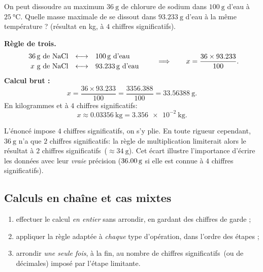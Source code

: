 \documentclass[11pt,a4paper]{article}
\newcommand{\CS}{chiffres significatifs}
\begin{document}
\begin{exemple}
On peut dissoudre au maximum $\qty{36}{\gram}$ de chlorure de sodium  dans $\qty{100}{\gram}$
d'eau à $\qty{25}{\celsius}$. Quelle masse maximale de  se dissout dans $\qty{93,233}{\gram}$
d'eau à la même température ? (résultat en \si{\kilo\gram}, à $4$ \CS).

\textbf{Règle de trois.}
\[
\begin{array}{r c l}
 \qty{36}{\gram}\ \text{de \ce{NaCl}} &\longleftrightarrow& \qty{100}{\gram}\ \text{d'eau}\\[2pt]
 x\ \text{g de \ce{NaCl}}             &\longleftrightarrow& \qty{93,233}{\gram}\ \text{d'eau}
\end{array}
\qquad\Longrightarrow\qquad
x=\frac{\num{36}\times\num{93,233}}{\num{100}}.
\]
\textbf{Calcul brut :}
\[ x=\frac{\num{36}\times\num{93,233}}{\num{100}}=\frac{\num{3356,388}}{\num{100}}=\qty{33,56388}{\gram}. \]
En kilogrammes et à $4$ \CS :
\[ \boxed{x\approx\qty{0,03356}{\kilo\gram}=\num{3,356e-2}\ \si{\kilo\gram}}. \]
\begin{remarque}
L'énoncé impose $4$ \CS, on s'y plie. En toute rigueur cependant, $\qty{36}{\gram}$ n'a que $2$ \CS :
la règle de multiplication limiterait alors le résultat à $2$ \CS\ ($\approx\qty{34}{\gram}$). Cet
écart illustre l'importance d'écrire les données avec leur \emph{vraie} précision
($\qty{36{,}00}{\gram}$ si elle est connue à $4$ \CS).
\end{remarque}
\end{exemple}

\subsection{Calculs en chaîne et cas mixtes}

\begin{methode}
\begin{enumerate}[leftmargin=1.8em,topsep=2pt,itemsep=1.5pt]
  \item effectuer le calcul \emph{en entier} sans arrondir, en gardant des chiffres de garde ;
  \item appliquer la règle adaptée à \emph{chaque} type d'opération, dans l'ordre des étapes ;
  \item arrondir \emph{une seule fois}, à la fin, au nombre de \CS\ (ou de décimales) imposé par
        l'étape limitante.
\end{enumerate}
\end{methode}
\end{document}
